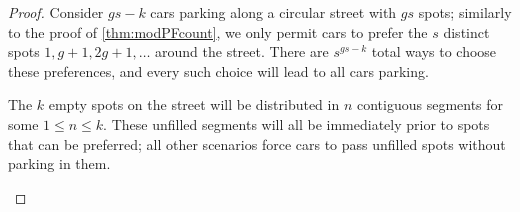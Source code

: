 \documentclass[12 pt]{amsart}
\theoremstyle{definition} %
\theoremstyle{remark} %
\begin{document}
\begin{proof}
    Consider $gs-k$ cars parking along a circular street with $gs$ spots; similarly to the proof of \cref{thm:modPFcount}, we only permit cars to prefer the $s$ distinct spots $1,g+1,2g+1,\ldots$ around the street. There are $s^{gs-k}$ total ways to choose these preferences, and every such choice will lead to all cars parking.

    The $k$ empty spots on the street will be distributed in $n$ contiguous segments for some $1\le n\le k.$ These unfilled segments will all be immediately prior to spots that can be preferred; all other scenarios force cars to pass unfilled spots without parking in them.


\begin{figure}[h]
    \centering
\end{figure}
\end{proof}
\end{document}
